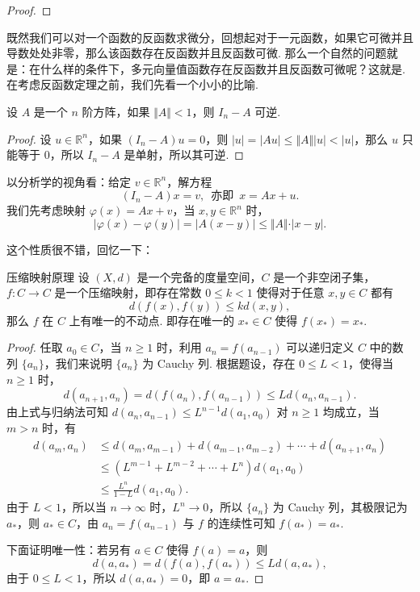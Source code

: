 \begin{proof}

\end{proof}

既然我们可以对一个函数的反函数求微分，回想起对于一元函数，如果它可微并且导数处处非零，那么该函数存在反函数并且反函数可微. 那么一个自然的问题就是：在什么样的条件下，多元向量值函数存在反函数并且反函数可微呢？这就是. 在考虑反函数定理之前，我们先看一个小小的比喻.

\begin{example}{}{}
    设 $A$ 是一个 $n$ 阶方阵，如果 $\Vert A\Vert < 1$，则 $I_n - A$ 可逆.
\end{example}

\begin{proof}
    设 $u\in \mathbb{R}^n$，如果 $(I_n - A)u = 0$，则 $\vert u\vert = \vert Au\vert \leqslant \Vert A\Vert \vert u\vert < \vert u\vert$，那么 $u$ 只能等于 $0$，所以 $I_n - A$ 是单射，所以其可逆.
\end{proof}

以分析学的视角看：给定 $v\in \mathbb{R}^n$，解方程 \[(I_n - A)x = v,\enspace\text{亦即}\enspace x = Ax+u.\]
我们先考虑映射 $\varphi(x) = Ax+v$，当 $x,y\in \mathbb{R}^n$ 时，\[\vert \varphi(x) - \varphi(y)\vert = \vert A(x - y)\vert\leqslant \Vert A\Vert\cdot \vert x - y\vert.\]

这个性质很不错，回忆一下：

\begin{theorem}{压缩映射原理}{}
    设 $(X,d)$ 是一个完备的度量空间，$C$ 是一个非空闭子集，$f: C\to C$ 是一个压缩映射，即存在常数 $0\leqslant k < 1$ 使得对于任意 $x, y\in C$ 都有 \[d(f(x), f(y))\leqslant kd(x, y),\]那么 $f$ 在 $C$ 上有唯一的不动点. 即存在唯一的 $x_*\in C$ 使得 $f(x_*) = x_*$.
\end{theorem}

\begin{proof}
    任取 $a_0 \in C$，当 $n\geqslant 1$ 时，利用 $a_n = f(a_{n-1})$ 可以递归定义 $C$ 中的数列 $\{a_n\}$，我们来说明 $\{a_n\}$ 为 Cauchy 列. 根据题设，存在 $0\leqslant L <1$，使得当 $n\geqslant 1$ 时，\[d(a_{n+1}, a_n) = d(f(a_n), f(a_{n-1}))\leqslant Ld(a_n, a_{n-1}).\]
    由上式与归纳法可知 $d(a_n,a_{n-1})\leqslant L^{n-1}d(a_1, a_0)$ 对 $n\geqslant 1$ 均成立，当 $m > n$ 时，有
    \[\begin{aligned}
        d(a_m, a_n) & \leqslant d(a_m, a_{m-1}) + d(a_{m-1}, a_{m-2}) + \cdots + d(a_{n+1}, a_n) \\
        & \leqslant (L^{m-1} + L^{m-2} + \cdots + L^{n})d(a_1, a_0) \\
        & \leqslant \frac{L^n}{1-L}d(a_1, a_0).
    \end{aligned}\]
    由于 $L < 1$，所以当 $n\to\infty$ 时，$L^n\to 0$，所以 $\{a_n\}$ 为 Cauchy 列，其极限记为 $a_*$，则 $a_*\in C$，由 $a_n = f(a_{n-1})$ 与 $f$ 的连续性可知 $f(a_*) = a_*$.

    下面证明唯一性：若另有 $a\in C$ 使得 $f(a) = a$，则\[d(a, a_*) = d(f(a), f(a_*))\leqslant Ld(a, a_*),\]由于 $0\leqslant L < 1$，所以 $d(a, a_*) = 0$，即 $a = a_*$.
\end{proof}

